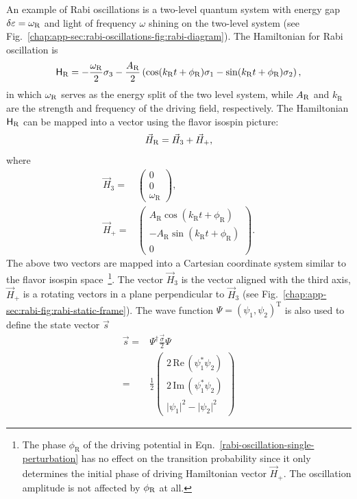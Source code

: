 An example of Rabi oscillations is a two-level quantum system with energy gap $\delta\varepsilon = \omega_{\mathrm R}$ and light of frequency $\omega$ shining on the two-level system (see Fig.~\ref{chap:app-sec:rabi-oscillations-fig:rabi-diagram}).
The Hamiltonian for Rabi oscillation is
\begin{equation}
    \mathsf H_{\RR} = -\frac{\omega_{\RR}}{2}\sigma_3 - \frac{A_{\RR} }{2}  \left( \cos(k_{\RR} t +\phi_{\RR})\sigma_1  - \sin(k_{\RR} t +\phi_{\RR}) \sigma_2\right),
    \label{rabi-oscillation-single-perturbation}
\end{equation}
in which $\omega_{\mathrm R}$ serves as the energy split of the two level system, while $A_{\mathrm R}$ and $k_{\mathrm{R}}$ are the strength and frequency of the driving field, respectively. The Hamiltonian $\mathsf H_\mathrm R$ can be mapped into a vector using the flavor isospin picture:
\begin{equation*}
\vec H_{\mathrm R} = \vec H_3 + \vec H_+,
\end{equation*}
where
\begin{align}
    \vec{H}_3 = & \begin{pmatrix}
    0 \\ 0 \\ \omega_{\mathrm R}
    \end{pmatrix}, \\
    \vec{H}_+ = & \begin{pmatrix}
    A_{\mathrm{R}} \cos(k_{\mathrm{R}} t +\phi_{\mathrm{R}}) \\
    - A_{\mathrm{R}} \sin(k_{\mathrm{R}} t +\phi_{\mathrm{R}}) \\
    0
    \end{pmatrix}.
    \label{chap:app-sec:rabi-eqn:h3-and-hplus}
\end{align}
The above two vectors are mapped into a Cartesian coordinate system similar to the flavor isospin space~\footnote{ The phase $\phi_{\mathrm{R}}$ of the driving potential in Eqn.~\ref{rabi-oscillation-single-perturbation} has no effect on the transition probability since it only determines the initial phase of driving Hamiltonian vector $\vec{H}_+$. The oscillation amplitude is not affected by $\phi_\mathrm R$ at all.}. The vector $\vec{H}_3$ is the vector aligned with the third axis, $\vec{H}_+$ is a rotating vectors in a plane perpendicular to $\vec{H}_3$ (see Fig.~\ref{chap:app-sec:rabi-fig:rabi-static-frame}). The wave function $\Psi=(\psi_1,\psi_2)^{\mathrm{T}}$ is also used to define the state vector $\vec{s}$
\begin{align}
    \vec{s} =& \Psi^\dagger \frac{\vec{\sigma}}{2}\Psi \\
    =& \frac{1}{2}\begin{pmatrix}
    2\,\mathrm{Re}\,(\psi_1^* \psi_2) \\
    2\,\mathrm{Im}\,(\psi_1^*\psi_2) \\
    \lvert \psi_1 \rvert^2 - \lvert \psi_2 \rvert^2
    \end{pmatrix}
\end{align}



